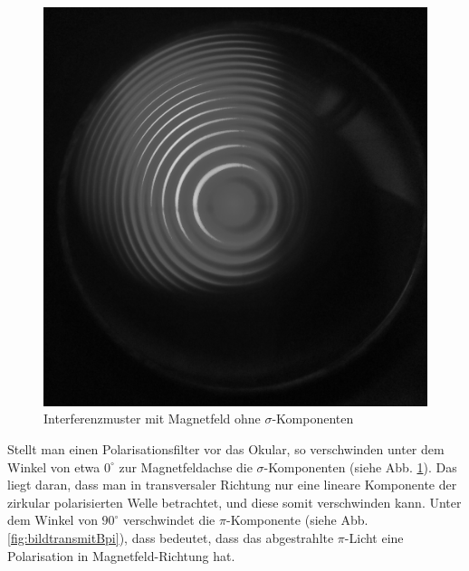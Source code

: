 \begin{figure}
\centering
\includegraphics[scale=0.1]{data/bilder_okular/bild_3_edit.jpg}
\caption{Interferenzmuster mit Magnetfeld ohne $\sigma$-Komponenten}
\label{fig:bildtransmitBsigma}
\end{figure}
Stellt man einen Polarisationsfilter vor das Okular, so verschwinden unter dem Winkel von etwa $0^\circ$ zur Magnetfeldachse die $\sigma$-Komponenten (siehe Abb. \ref{fig:bildtransmitBsigma}). Das liegt daran, dass man in transversaler Richtung nur eine lineare Komponente der zirkular polarisierten Welle betrachtet, und diese somit verschwinden kann. Unter dem Winkel von $90^\circ$ verschwindet die $\pi$-Komponente (siehe Abb. \ref{fig:bildtransmitBpi}), dass bedeutet, dass das abgestrahlte $\pi$-Licht eine Polarisation in Magnetfeld-Richtung hat.\\

